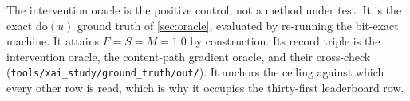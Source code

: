 The intervention oracle is the positive control, not a method under test. It is the exact
$\mathrm{do}(u)$ ground truth of \Sectionname\ref{sec:oracle}, evaluated by re-running the bit-exact machine. It
attains $F=S=M=1.0$ by construction. Its record triple is the intervention oracle, the
content-path gradient oracle, and their cross-check
(\texttt{tools/xai\_study/ground\_truth/out/}). It anchors the ceiling against which every
other row is read, which is why it occupies the thirty-first leaderboard row.
